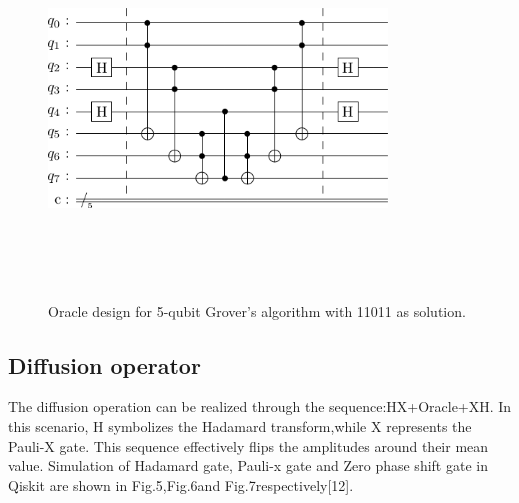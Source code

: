\documentclass[conference]{IEEEtran}
\begin{document}
\begin{figure}[htbp]
	\centerline{\includegraphics[width=9cm,height=10cm,keepaspectratio]{5-qubit.png}}
	\caption{Oracle design for 5-qubit Grover’s algorithm with 11011 as solution.}
	\label{fig}
\end{figure}

\subsection{Diffusion operator}
The diffusion operation can be realized through the sequence:HX+Oracle+XH. In this scenario, H symbolizes
the Hadamard transform,while X represents the Pauli-X gate.
This sequence effectively flips the amplitudes around their
mean value. Simulation of Hadamard gate, Pauli-x gate and
Zero phase shift gate in Qiskit are shown in Fig.5,Fig.6and
Fig.7respectively[12].
\end{document}
